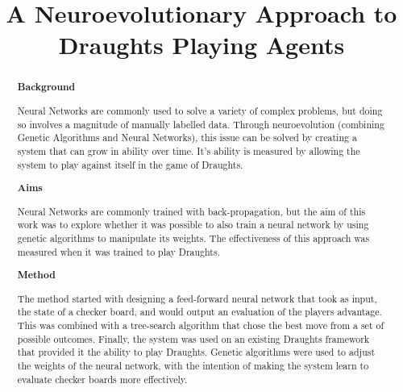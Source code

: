 \documentclass[12pt,a4paper]{article}
\title{A Neuroevolutionary Approach to Draughts Playing Agents}
\author{}
\date{}
\begin{document}
    \maketitle


\begin{abstract}


    {\bf Background}

    Neural Networks are commonly used to solve a variety of complex problems, but doing so involves a magnitude of manually labelled data. Through neuroevolution (combining Genetic Algorithms and Neural Networks), this issue can be solved by creating a system that can grow in ability over time. It's ability is measured by allowing the system to play against itself in the game of Draughts.
    
    {\bf Aims}

    Neural Networks are commonly trained with back-propagation, but the aim of this work was to explore whether it was possible to also train a neural network by using genetic algorithms to manipulate its weights. The effectiveness of this approach was measured when it was trained to play Draughts.

    {\bf Method}

    The method started with designing a feed-forward neural network that took as input, the state of a checker board, and would output an evaluation of the players advantage. This was combined with a tree-search algorithm that chose the best move from a set of possible outcomes. Finally, the system was used on an existing Draughts framework that provided it the ability to play Draughts. Genetic algorithms were used to adjust the weights of the neural network, with the intention of making the system learn to evaluate checker boards more effectively. 
    

\end{abstract}
\end{document}
